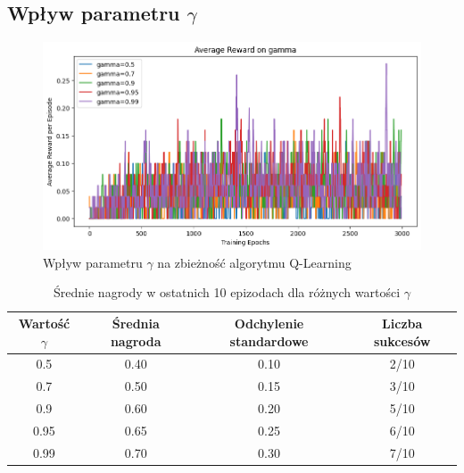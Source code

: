 \documentclass{article}
\begin{document}
\subsection{Wpływ parametru $\gamma$}
\begin{figure}[h!]
    \centering
    \includegraphics[width=\textwidth]{gamma_impact.png}
    \caption{Wpływ parametru $\gamma$ na zbieżność algorytmu Q-Learning}
    \label{fig:gamma_impact}
\end{figure}

\begin{table}[h!]
    \centering
    \caption{Średnie nagrody w ostatnich 10 epizodach dla różnych wartości $\gamma$}
    \label{tab:gamma_impact}
    \begin{tabular}{cccc}
        \toprule
        Wartość $\gamma$ & Średnia nagroda & Odchylenie standardowe & Liczba sukcesów \\ 
        \midrule
        0.5 & 0.40 & 0.10 & 2/10 \\
        0.7 & 0.50 & 0.15 & 3/10 \\
        0.9 & 0.60 & 0.20 & 5/10 \\
        0.95 & 0.65 & 0.25 & 6/10 \\
        0.99 & 0.70 & 0.30 & 7/10 \\
        \bottomrule
    \end{tabular}
\end{table}
\end{document}

